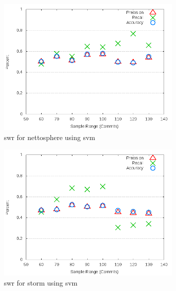 \begin{figure}[!t]
\centering
\includegraphics[width=0.8\textwidth]{images/svm/test_1/nettosphere_sample_range.png}
\caption{\gls{swr} for nettosphere using \gls{svm}}
\label{fig:test_1_nettosphere_svm}
\end{figure}

\clearpage
\begin{figure}[!t]
\centering
\includegraphics[width=0.8\textwidth]{images/svm/test_1/storm_sample_range.png}
\caption{\gls{swr} for storm using \gls{svm}}
\label{fig:test_1_storm_svm}
\end{figure}

